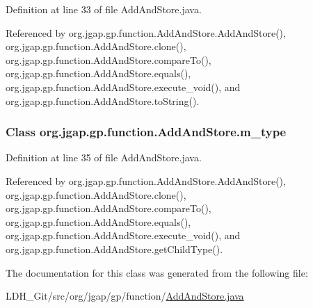 Definition at line 33 of file Add\-And\-Store.\-java.



Referenced by org.\-jgap.\-gp.\-function.\-Add\-And\-Store.\-Add\-And\-Store(), org.\-jgap.\-gp.\-function.\-Add\-And\-Store.\-clone(), org.\-jgap.\-gp.\-function.\-Add\-And\-Store.\-compare\-To(), org.\-jgap.\-gp.\-function.\-Add\-And\-Store.\-equals(), org.\-jgap.\-gp.\-function.\-Add\-And\-Store.\-execute\-\_\-void(), and org.\-jgap.\-gp.\-function.\-Add\-And\-Store.\-to\-String().

\hypertarget{classorg_1_1jgap_1_1gp_1_1function_1_1_add_and_store_a01a50be6c8cc4fa4106878c9e7e618a0}{
\subsubsection[{m\-\_\-type}]{\setlength{\rightskip}{0pt plus 5cm}Class org.\-jgap.\-gp.\-function.\-Add\-And\-Store.\-m\-\_\-type\hspace{0.3cm}{\ttfamily [private]}}}\label{classorg_1_1jgap_1_1gp_1_1function_1_1_add_and_store_a01a50be6c8cc4fa4106878c9e7e618a0}


Definition at line 35 of file Add\-And\-Store.\-java.



Referenced by org.\-jgap.\-gp.\-function.\-Add\-And\-Store.\-Add\-And\-Store(), org.\-jgap.\-gp.\-function.\-Add\-And\-Store.\-clone(), org.\-jgap.\-gp.\-function.\-Add\-And\-Store.\-compare\-To(), org.\-jgap.\-gp.\-function.\-Add\-And\-Store.\-equals(), org.\-jgap.\-gp.\-function.\-Add\-And\-Store.\-execute\-\_\-void(), and org.\-jgap.\-gp.\-function.\-Add\-And\-Store.\-get\-Child\-Type().



The documentation for this class was generated from the following file\-:\begin{DoxyCompactItemize}
\item 
L\-D\-H\-\_\-\-Git/src/org/jgap/gp/function/\hyperlink{_add_and_store_8java}{Add\-And\-Store.\-java}\end{DoxyCompactItemize}

